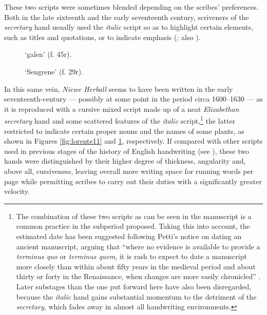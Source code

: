 \begin{paper}
These two scripts were sometimes blended depending on the scribes'
preferences. Both in the late sixteenth and the early seventeenth
century, scriveners of the \emph{secretary} hand usually used the
\emph{italic} script so as to highlight certain elements, such as titles
and quotations, or to indicate emphasis (\cite[9]{dawson_elizabethan_1966}; also \cite[29]{fairbank_renaissance_1960}).

\begin{figure}[H]
  \centering
  \begin{minipage}[b]{0.44\textwidth}
    \caption{`galen' (f. 45r).}
    \label{fig:lorente11}
  \end{minipage}
  \hfill
  \begin{minipage}[b]{0.45\textwidth}
    \caption{`Sengrene' (f. 29r).}
    \label{fig:lorente12}
  \end{minipage}
\end{figure}

In this same vein, \emph{Niewe Herball} seems to have been written in
the early seventeenth-century –– possibly at some point in the period
circa 1600--1630 –– as it is reproduced with a cursive mixed script made up of
a neat \emph{Elizabethan secretary} hand and some scattered features of
the \emph{italic} script,\footnote{The combination of these two scripts as can be seen in the manuscript is a common practice in
  the subperiod proposed. Taking this into account, the estimated date
  has been suggested following Petti's notice on dating an ancient
  manuscript, arguing that ``where no evidence is available to provide a
  \emph{terminus quo} or \emph{terminus quem}, it is rash to expect to
  date a manuscript more closely than within about fifty years in the
  medieval period and about thirty or forty in the Renaissance, when
  changes are more easily chronicled'' \citep[33]{petti_english_1977}. Later substages than
  the one put forward here have also been disregarded, because the
  \emph{italic} hand gains substantial momentum to the detriment of the
  \emph{secretary}, which fades away in almost all handwriting
  environments.} the latter restricted to indicate certain proper nouns
and the names of some plants, as shown in Figures \ref{fig:lorente11} and \ref{fig:lorente12},
respectively. If compared with other scripts used in previous stages of
the history of English handwriting (see \cite{calle-martin_through_2011}), these two
hands were distinguished by their higher degree of thickness, angularity
and, above all, cursiveness, leaving overall more writing space for
running words per page while permitting scribes to carry out their
duties with a significantly greater velocity.



\end{paper}
